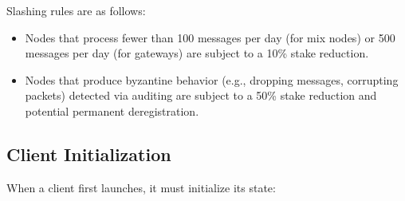 \documentclass[11pt]{article}
\theoremstyle{definition}
\theoremstyle{remark}
\begin{document}
Slashing rules are as follows:
\begin{itemize}
    \item Nodes that process fewer than 100 messages per day (for mix nodes) or 500 messages per day (for gateways) are subject to a 10\% stake reduction.
    \item Nodes that produce byzantine behavior (e.g., dropping messages, corrupting packets) detected via auditing are subject to a 50\% stake reduction and potential permanent deregistration.
\end{itemize}

\subsection{Client Initialization}
\label{subsec:init}

When a client first launches, it must initialize its state:
\end{document}
